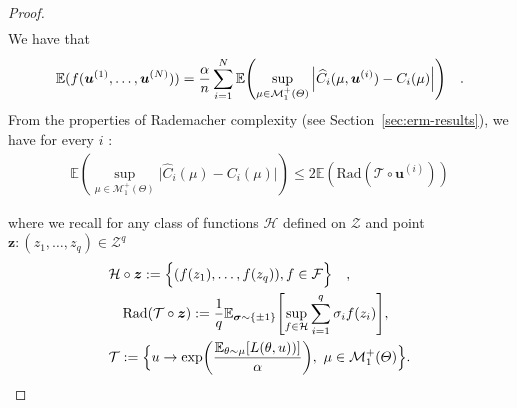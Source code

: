 \begin{proof}
\begin{align*}
\end{align*}
We have that 
\begin{align*}
    \mathbb{E}(f(\bm{u}^{(1)},\dots,\bm{u}^{(\numsamples)}))=\frac{\alpha}{n} \sum_{i=1}^\numsamples \mathbb{E}\left(\sup_{\mu\in \mathcal{M}^+_1(\Theta)}\Big |\widehat{C}_i(\mu,\bm{u}^{(i)}) -C_i(\mu)\Big |\right) \quad.   
\end{align*}
From the properties of Rademacher complexity (see Section~\ref{sec:erm-results}), we have for every $i$ :
\begin{align*}
    \mathbb{E}\left(\sup_{\mu\in \mathcal{M}^+_1(\Theta)}\Big |\widehat{C}_i(\mu) -C_i(\mu)\Big |\right)\leq 2 \mathbb{E}(\text{Rad}(\mathcal{T}\circ \bm{u}^{(i)}))   
\end{align*}

where we recall for any class of functions $\mathcal{H}$ defined on $\mathcal{Z}$  and point $\bm{z}:(z_1,\dots,z_q)\in\mathcal{Z}^q$
\begin{align*}
    &\mathcal{H}\circ \bm{z}:=\Big\{(f(z_1),\dots,f(z_q)),f\in\mathcal{F}\Big\} \quad,\\
    &\quad \text{Rad}(\mathcal{T}\circ \bm{z}):=\frac{1}{q}\mathbb{E}_{\bm{\sigma}\sim\{\pm 1\}}\left[\sup_{f\in\mathcal{H}}\sum_{i=1}^q\sigma_if(z_i)\right],\\
    &\mathcal{T}:=\Big\{u\rightarrow\exp\left(\frac{\mathbb{E}_{\theta \sim \mu}\left[\loss(\theta,u))\right]}{\alpha}\right),~\mu\in\mathcal{M}_{1}^{+}(\Theta) \Big\}.
      \end{align*}


\end{proof}
